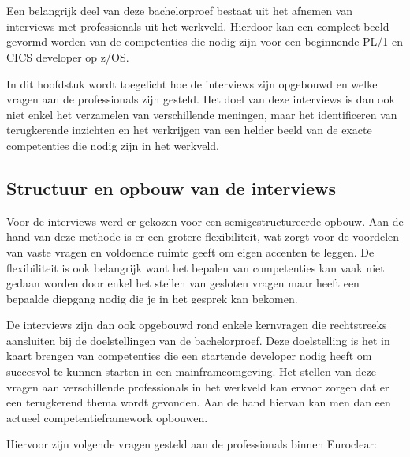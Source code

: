 
\chapter{}%
\label{ch:Interviews}


Een belangrijk deel van deze bachelorproef bestaat uit het afnemen van 
interviews met professionals uit het werkveld. Hierdoor kan een compleet 
beeld gevormd worden van de competenties die nodig zijn voor een beginnende 
PL/1 en CICS developer op z/OS.

In dit hoofdstuk wordt toegelicht hoe de interviews zijn opgebouwd en welke 
vragen aan de professionals zijn gesteld. Het doel van deze interviews is dan 
ook niet enkel het verzamelen van verschillende meningen, maar het identificeren 
van terugkerende inzichten en het verkrijgen van een helder beeld van de 
exacte competenties die nodig zijn in het werkveld.


\section{Structuur en opbouw van de interviews}%
\label{sec:opbouw-van-de-interviews}

Voor de interviews werd er gekozen voor een semigestructureerde opbouw.
Aan de hand van deze methode is er een grotere flexibiliteit, wat zorgt voor de voordelen van 
vaste vragen en voldoende ruimte geeft om eigen accenten te leggen.
De flexibiliteit is ook belangrijk want het bepalen van competenties kan vaak niet gedaan worden door 
enkel het stellen van gesloten vragen maar heeft een bepaalde diepgang nodig die je in het gesprek kan bekomen.

De interviews zijn dan ook opgebouwd rond enkele kernvragen die rechtstreeks aansluiten bij de doelstellingen van de bachelorproef.
Deze doelstelling is het in kaart brengen van competenties die een startende developer nodig heeft om succesvol te kunnen starten in een mainframeomgeving.
Het stellen van deze vragen aan verschillende professionals in het werkveld kan ervoor zorgen dat er een terugkerend thema wordt gevonden.
Aan de hand hiervan kan men dan een actueel competentieframework opbouwen.

Hiervoor zijn volgende vragen gesteld aan de professionals binnen Euroclear:


